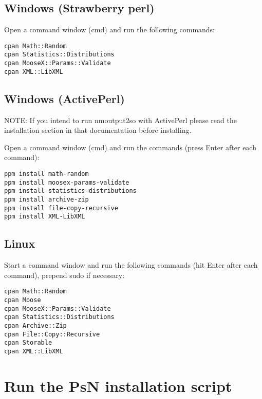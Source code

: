 \subsection{Windows (Strawberry perl)}
Open a command window (cmd) and run the following commands:

\begin{verbatim}
cpan Math::Random
cpan Statistics::Distributions
cpan MooseX::Params::Validate
cpan XML::LibXML
\end{verbatim}


\subsection{Windows (ActivePerl)}

NOTE: If you intend to run nmoutput2so with ActivePerl please read the installation section in that documentation before installing.

Open a command window (cmd) and run the commands (press Enter after each command):

\begin{verbatim}
ppm install math-random
ppm install moosex-params-validate
ppm install statistics-distributions
ppm install archive-zip
ppm install file-copy-recursive
ppm install XML-LibXML
\end{verbatim}



\subsection{Linux}

Start a command window and run the following commands (hit Enter after each command), prepend sudo if necessary:
\begin{verbatim}
cpan Math::Random
cpan Moose
cpan MooseX::Params::Validate
cpan Statistics::Distributions
cpan Archive::Zip
cpan File::Copy::Recursive
cpan Storable
cpan XML::LibXML
\end{verbatim}

\section{Run the PsN installation script}

